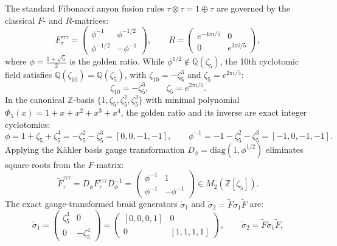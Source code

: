 \documentclass[11pt,onecolumn]{article}
\begin{document}
The standard Fibonacci anyon fusion rules $\tau \otimes \tau = 1 \oplus \tau$ are governed by the classical $F$- and $R$-matrices:
\begin{equation}
F_\tau^{\tau\tau\tau} = \begin{pmatrix} \phi^{-1} & \phi^{-1/2} \\ \phi^{-1/2} & -\phi^{-1} \end{pmatrix}, \qquad R = \begin{pmatrix} e^{-4\pi i/5} & 0 \\ 0 & e^{3\pi i/5} \end{pmatrix},
\label{eq:v8_21}
\end{equation}
where $\phi = \frac{1+\sqrt{5}}{2}$ is the golden ratio. While $\phi^{1/2} \notin \mathbb{Q}(\zeta_5)$, the 10th cyclotomic field satisfies $\mathbb{Q}(\zeta_{10}) = \mathbb{Q}(\zeta_5)$, with $\zeta_{10} = -\zeta_5^3$ and $\zeta_5 = e^{2\pi i/5}$:
\begin{equation}
\zeta_{10} = -\zeta_5^3, \qquad \zeta_5 = e^{2\pi i/5}.
\label{eq:v8_22}
\end{equation}
In the canonical $\mathbb{Z}$-basis $\{1, \zeta_5, \zeta_5^2, \zeta_5^3\}$ with minimal polynomial $\Phi_5(x) = 1 + x + x^2 + x^3 + x^4$, the golden ratio and its inverse are exact integer cyclotomics:
\begin{equation}
\phi = 1 + \zeta_5 + \zeta_5^4 = -\zeta_5^2 - \zeta_5^3 = [0, 0, -1, -1], \qquad \phi^{-1} = -1 - \zeta_5^2 - \zeta_5^3 = [-1, 0, -1, -1].
\label{eq:v8_23}
\end{equation}
Applying the Kähler basis gauge transformation $D_\phi = \mathrm{diag}(1, \phi^{1/2})$ eliminates square roots from the $F$-matrix:
\begin{equation}
\widetilde{F}_\tau^{\tau\tau\tau} = D_\phi F_\tau^{\tau\tau\tau} D_\phi^{-1} = \begin{pmatrix} \phi^{-1} & 1 \\ \phi^{-1} & -\phi^{-1} \end{pmatrix} \in M_2(\mathbb{Z}[\zeta_5]).
\label{eq:v8_24}
\end{equation}
The exact gauge-transformed braid generators $\widetilde{\sigma}_1$ and $\widetilde{\sigma}_2 = \widetilde{F}\widetilde{\sigma}_1\widetilde{F}$ are:
\begin{equation}
\widetilde{\sigma}_1 = \begin{pmatrix} \zeta_5^3 & 0 \\ 0 & -\zeta_5^4 \end{pmatrix} = \begin{pmatrix} [0, 0, 0, 1] & 0 \\ 0 & [1, 1, 1, 1] \end{pmatrix}, \qquad \widetilde{\sigma}_2 = \widetilde{F} \widetilde{\sigma}_1 \widetilde{F},
\label{eq:v8_25}
\end{equation}
\end{document}
